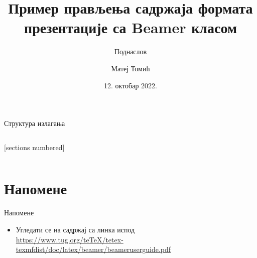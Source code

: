 \documentclass[aspectratio=169,10pt]{beamer}
\title{Пример прављења садржаја формата презентације са Beamer класом}
\subtitle{Поднаслов}
\date{{12. октобар 2022.}}
\author{Матеј Томић}
\institute{Истраживачко-развојни центар}
\begin{document}
\sloppy
  


\maketitle

\begin{frame}{Структура излагања}
  
  \begin{columns}
    \begin{minipage}[t][0.5\textheight]{0.75\textwidth}
    [sections numbered]
      \tableofcontents[sectionstyle=show]
    \end{minipage}\hfill
    \end{columns}
\end{frame}

\section{Напомене}
\begin{frame}{Напомене}

\begin{itemize}

        \item Угледати се на садржај са линка испод \\
        \small{\url{https://www.tug.org/teTeX/tetex-texmfdist/doc/latex/beamer/beameruserguide.pdf}}
\end{itemize}
    
\end{frame}
\end{document}
